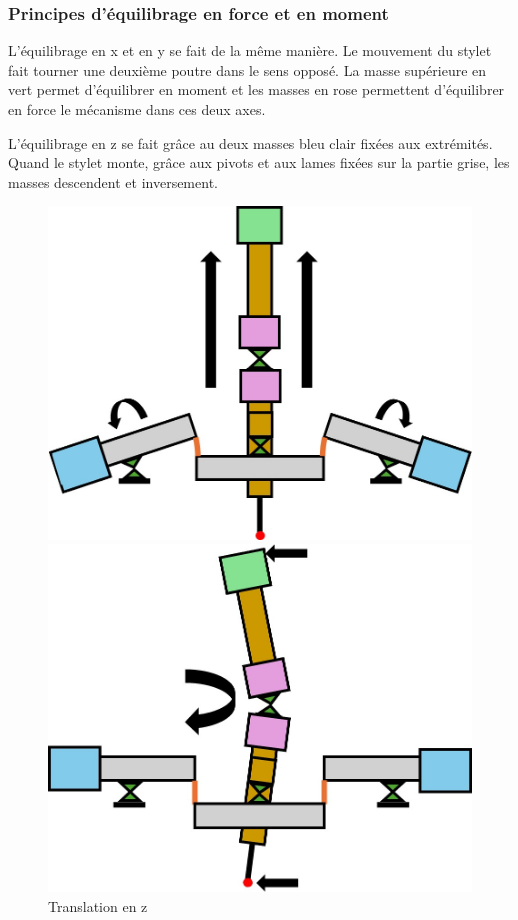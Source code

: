 \documentclass[a4paper, 11pt]{article} %
\begin{document}
\subsubsection{Principes d’équilibrage en force et en moment}

L'équilibrage en x et en y se fait de la même manière. Le mouvement du stylet fait tourner une deuxième poutre dans le sens opposé. La masse supérieure en vert permet d'équilibrer en moment et les masses en rose permettent d'équilibrer en force le mécanisme dans ces deux axes.

L'équilibrage en z se fait grâce au deux masses bleu clair fixées aux extrémités. Quand le stylet monte, grâce aux pivots et aux lames fixées sur la partie grise, les masses descendent et inversement.

\begin{figure}[H]
    \centering
    \begin{minipage}[t]{0.30\linewidth}
        \centering
        \includegraphics[width=\linewidth]{images/flyforce_z.jpg} 
        \caption{Translation en z}  
        \label{fig:mouvement_z}
    \end{minipage}
    \hfill
    \begin{minipage}[t]{0.30\linewidth}
        \centering
        \includegraphics[width=\linewidth]{images/flyforce_xy.jpg} 

\end{minipage}
\end{figure}
\end{document}
